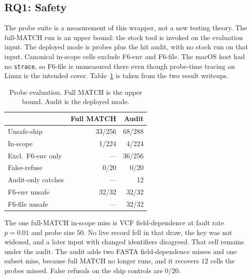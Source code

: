 \documentclass[letterpaper,twocolumn,10pt]{article}
\begin{document}
\subsection{RQ1: Safety}
\label{sec:rq1}

The probe suite is a measurement of this wrapper, not a new testing theory.
The full-MATCH run is an upper bound: the stock tool is invoked on the evaluation input.
The deployed mode is probes plus the hit audit, with no stock run on that input.
Canonical in-scope cells exclude F6-env and F6-file.
The macOS host had no \texttt{strace}, so F6-file is unmeasured there even though probe-time tracing on Linux is the intended cover.
Table~\ref{tab:safety} is taken from the two result writeups.

\begin{table}[t]
\caption{Probe evaluation.
Full MATCH is the upper bound.
Audit is the deployed mode.}
\label{tab:safety}
\small
\begin{tabular}{@{}lrr@{}}
\toprule
& Full MATCH & Audit \\
\midrule
Unsafe-ship & 33/256 & 68/288 \\
In-scope & 1/224 & 4/224 \\
Excl.\ F6-env only & --- & 36/256 \\
False-refuse & 0/20 & 0/20 \\
Audit-only catches & --- & 12 \\
F6-env unsafe & 32/32 & 32/32 \\
F6-file unsafe & --- & 32/32 \\
\bottomrule
\end{tabular}
\end{table}

The one full-MATCH in-scope miss is VCF field-dependence at fault rate
$p = 0.01$
and probe size
$50$.
No live record fell in that draw, the key was not widened, and a later input with changed identifiers disagreed.
That cell remains under the audit.
The audit adds two FASTA field-dependence misses and one subset miss, because full MATCH no longer runs, and it recovers
$12$
cells the probes missed.
False refusals on the ship controls are
$0/20$.
\end{document}
